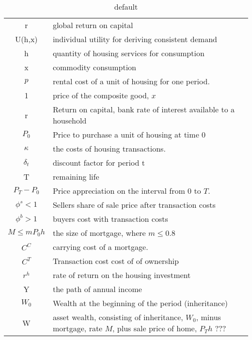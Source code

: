 \begin{table}[htp]
\caption{default}
\begin{center}
\begin{tabular}{cp{8cm}}
r& global return on capital\\
U(h,x)  & individual utility for deriving consistent demand\\
 h	 &quantity of housing services for consumption \\
x     	&commodity consumption\\
$p$ 	& rental cost of a unit of housing for one period. \\%
 1			&price of the composite good, $x$\\ 
 r			& Return on capital, bank rate of interest available to a household\\
$P_{0}$ 		& Price to purchase a unit of housing at time $0$ \\
 $\kappa$ & the costs of housing transactions.\\
 $\delta_t$& discount factor for period t\\
T 			& remaining life\\
 $P_T-P_0$	&Price appreciation on the interval from 0 to $T$.\\
$\phi^s<1$	&Sellers share of sale price after transaction costs\\
$\phi^b>1$	&buyers cost with transaction costs\\
 $M\leq mP_0h$ 	&the size of mortgage, where $m\leq 0.8$\\
$C^C $&carrying cost of a mortgage. \\
$C^T$&Transaction cost cost of of ownership \\
$r^h$&rate of  return on the housing investment\\	
  Y & the path of annual income\\
$W_0$& Wealth at the beginning of the period (inheritance)\\
W&asset wealth, consisting of inheritance, $W_0$, minus mortgage, rate $M$,  plus sale price of home,  $P_Th$  ??? \\
\end{tabular}
\end{center}
\label{default}
\end{table}

